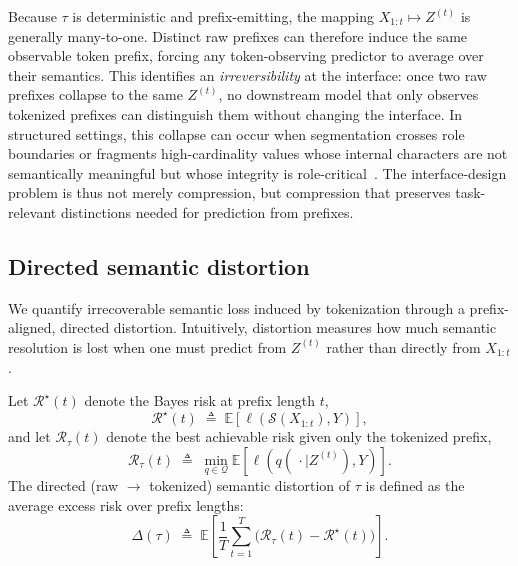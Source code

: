 Because $\tau$ is deterministic and prefix-emitting, the mapping $X_{1:t} \mapsto Z^{(t)}$ is generally many-to-one.
Distinct raw prefixes can therefore induce the same observable token prefix, forcing any token-observing
predictor to average over their semantics.
This identifies an \emph{irreversibility} at the interface: once two raw prefixes collapse to the same
$Z^{(t)}$, no downstream model that only observes tokenized prefixes can distinguish them without changing the interface.
In structured settings, this collapse can occur when segmentation crosses role boundaries or fragments
high-cardinality values whose internal characters are not semantically meaningful but whose integrity is
role-critical~\cite{yin2020tabert,herzig2020tapas}.
The interface-design problem is thus not merely compression, but compression that preserves task-relevant
distinctions needed for prediction from prefixes.

\subsection{Directed semantic distortion}
\label{sec:bg_distortion}

We quantify irrecoverable semantic loss induced by tokenization through a prefix-aligned, directed distortion.
Intuitively, distortion measures how much semantic resolution is lost when one must predict from
$Z^{(t)}$ rather than directly from $X_{1:t}$.

Let $\mathcal{R}^\star(t)$ denote the Bayes risk at prefix length $t$,
\begin{equation}
\mathcal{R}^\star(t)
\;\triangleq\;
\mathbb{E}\!\left[\ell\!\left(\mathcal{S}(X_{1:t}), Y\right)\right],
\label{eq:bayes_risk_raw}
\end{equation}
and let $\mathcal{R}_\tau(t)$ denote the best achievable risk given only the tokenized prefix,
\begin{equation}
\mathcal{R}_\tau(t)
\;\triangleq\;
\min_{q \in \mathcal{Q}}
\mathbb{E}\!\left[\ell\!\left(q(\,\cdot \mid Z^{(t)}), Y\right)\right].
\label{eq:bayes_risk_tok}
\end{equation}
The directed (raw $\rightarrow$ tokenized) semantic distortion of $\tau$ is defined as the average excess risk
over prefix lengths:
\begin{equation}
\Delta(\tau)
\;\triangleq\;
\mathbb{E}\!\left[
\frac{1}{T}\sum_{t=1}^{T}
\big(\mathcal{R}_\tau(t) - \mathcal{R}^\star(t)\big)
\right].
\label{eq:semantic_distortion}
\end{equation}


